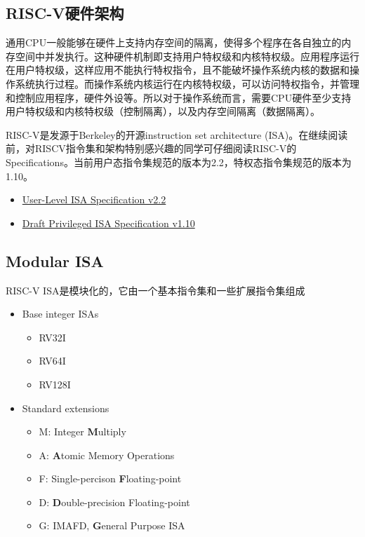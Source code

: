 \subsection{RISC-V硬件架构}\label{riscv}

通用CPU一般能够在硬件上支持内存空间的隔离，使得多个程序在各自独立的内存空间中并发执行。这种硬件机制即支持用户特权级和内核特权级。应用程序运行在用户特权级，这样应用不能执行特权指令，且不能破坏操作系统内核的数据和操作系统执行过程。而操作系统内核运行在内核特权级，可以访问特权指令，并管理和控制应用程序，硬件外设等。所以对于操作系统而言，需要CPU硬件至少支持用户特权级和内核特权级（控制隔离），以及内存空间隔离（数据隔离）。

RISC-V是发源于Berkeley的开源instruction set architecture
(ISA)。在继续阅读前，对RISCV指令集和架构特别感兴趣的同学可仔细阅读RISC-V的Specifications。当前用户态指令集规范的版本为2.2，特权态指令集规范的版本为1.10。

\begin{itemize}
\item
  \href{https://riscv.org/specifications/}{User-Level ISA Specification
  v2.2}
\item
  \href{https://riscv.org/specifications/privileged-isa}{Draft
  Privileged ISA Specification v1.10}
\end{itemize}

\subsection{Modular ISA}\label{modular-isa}

RISC-V ISA是模块化的，它由一个基本指令集和一些扩展指令集组成

\begin{itemize}
\item
  Base integer ISAs

  \begin{itemize}
  \item
    RV32I
  \item
    RV64I
  \item
    RV128I
  \end{itemize}
\item
  Standard extensions

  \begin{itemize}
  \item
    M: Integer \textbf{M}ultiply
  \item
    A: \textbf{A}tomic Memory Operations
  \item
    F: Single-percison \textbf{F}loating-point
  \item
    D: \textbf{D}ouble-precision Floating-point
  \item
    G: IMAFD, \textbf{G}eneral Purpose ISA
  \end{itemize}
\end{itemize}

